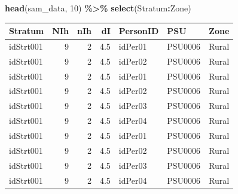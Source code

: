 \documentclass[
  12pt,
]{book}
\newenvironment{Shaded}{\begin{snugshade}}{\end{snugshade}}
\newcommand{\AttributeTok}[1]{\textcolor[rgb]{0.13,0.29,0.53}{#1}}
\newcommand{\DecValTok}[1]{\textcolor[rgb]{0.00,0.00,0.81}{#1}}
\newcommand{\FunctionTok}[1]{\textcolor[rgb]{0.13,0.29,0.53}{\textbf{#1}}}
\newcommand{\NormalTok}[1]{#1}
\newcommand{\OtherTok}[1]{\textcolor[rgb]{0.56,0.35,0.01}{#1}}
\newcommand{\SpecialCharTok}[1]{\textcolor[rgb]{0.81,0.36,0.00}{\textbf{#1}}}
\newcommand{\StringTok}[1]{\textcolor[rgb]{0.31,0.60,0.02}{#1}}
\begin{document}
\begin{Shaded}
\end{Shaded}

\begin{Shaded}
\begin{Highlighting}[]
\FunctionTok{head}\NormalTok{(sam\_data, }\DecValTok{10}\NormalTok{) }\SpecialCharTok{\%\textgreater{}\%} \FunctionTok{select}\NormalTok{(Stratum}\SpecialCharTok{:}\NormalTok{Zone)}
\end{Highlighting}
\end{Shaded}

\begin{tabular}{l|r|r|r|l|l|l}
\hline
Stratum & NIh & nIh & dI & PersonID & PSU & Zone\\
\hline
idStrt001 & 9 & 2 & 4.5 & idPer01 & PSU0006 & Rural\\
\hline
idStrt001 & 9 & 2 & 4.5 & idPer02 & PSU0006 & Rural\\
\hline
idStrt001 & 9 & 2 & 4.5 & idPer01 & PSU0006 & Rural\\
\hline
idStrt001 & 9 & 2 & 4.5 & idPer02 & PSU0006 & Rural\\
\hline
idStrt001 & 9 & 2 & 4.5 & idPer03 & PSU0006 & Rural\\
\hline
idStrt001 & 9 & 2 & 4.5 & idPer04 & PSU0006 & Rural\\
\hline
idStrt001 & 9 & 2 & 4.5 & idPer01 & PSU0006 & Rural\\
\hline
idStrt001 & 9 & 2 & 4.5 & idPer02 & PSU0006 & Rural\\
\hline
idStrt001 & 9 & 2 & 4.5 & idPer03 & PSU0006 & Rural\\
\hline
idStrt001 & 9 & 2 & 4.5 & idPer04 & PSU0006 & Rural\\
\hline
\end{tabular}
\end{document}
